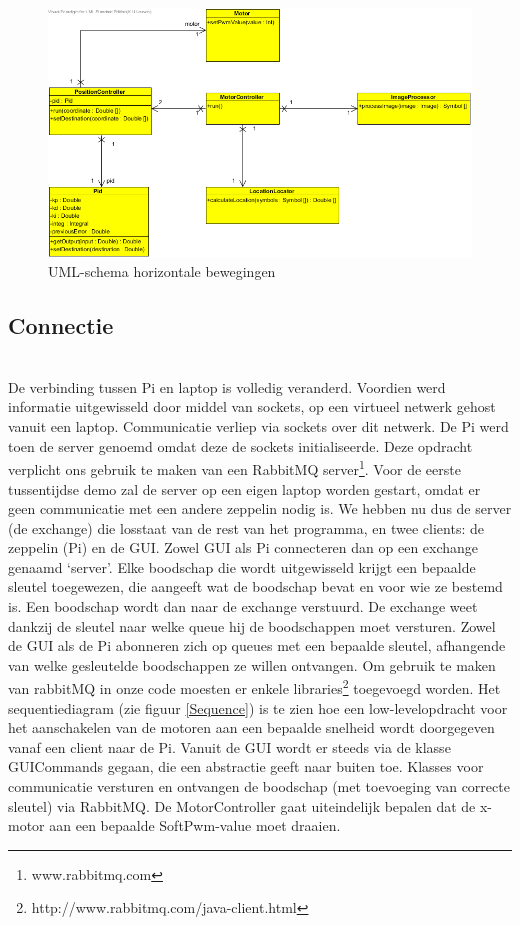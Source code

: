 \documentclass[tt]{penoverslag}
\begin{document}
\begin{figure}[H]
\begin{center}
\includegraphics[width=\textwidth]{XYNavigation.png}
\end{center}
\caption{UML-schema horizontale bewegingen}
\label{navigation}
\end{figure}

\subsection{Connectie}\\
De verbinding tussen Pi en laptop is volledig veranderd. Voordien werd informatie uitgewisseld door middel van sockets, op een virtueel netwerk gehost vanuit een laptop. Communicatie verliep via sockets over dit netwerk. De Pi werd toen de server genoemd omdat deze de sockets initialiseerde. Deze opdracht verplicht ons gebruik te maken van een RabbitMQ server\footnote{www.rabbitmq.com}. Voor de eerste tussentijdse demo zal de server op een eigen laptop worden gestart, omdat er geen communicatie met een andere zeppelin nodig is. We hebben nu dus de server (de exchange) die losstaat van de rest van het programma, en twee clients: de zeppelin (Pi) en de GUI. Zowel GUI als Pi connecteren dan op een exchange genaamd ‘server’. Elke boodschap die wordt uitgewisseld krijgt een bepaalde sleutel toegewezen, die aangeeft wat de boodschap bevat en voor wie ze bestemd is. Een boodschap wordt dan naar de exchange verstuurd. De exchange weet dankzij de sleutel naar welke queue hij de boodschappen moet versturen. Zowel de GUI als de Pi abonneren zich op queues met een bepaalde sleutel, afhangende van welke gesleutelde boodschappen ze willen ontvangen. Om gebruik te maken van rabbitMQ in onze code moesten er enkele libraries\footnote{http://www.rabbitmq.com/java-client.html} toegevoegd worden. Het sequentiediagram (zie figuur \ref{Sequence}) is te zien hoe een low-levelopdracht voor het aanschakelen van de motoren aan een bepaalde snelheid wordt doorgegeven vanaf een client naar de Pi. Vanuit de GUI wordt er steeds via de klasse GUICommands gegaan, die een abstractie geeft naar buiten toe. Klasses voor communicatie versturen en ontvangen de boodschap (met toevoeging van correcte sleutel) via RabbitMQ. De MotorController gaat uiteindelijk bepalen dat de x-motor aan een bepaalde SoftPwm-value moet draaien.
\\
\end{document}

